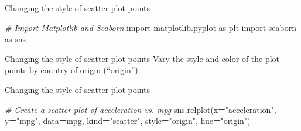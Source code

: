 \documentclass[
  ignorenonframetext,
]{beamer}
\newenvironment{Shaded}{\begin{snugshade}}{\end{snugshade}}
\newcommand{\CommentTok}[1]{\textcolor[rgb]{0.56,0.35,0.01}{\textit{#1}}}
\newcommand{\ImportTok}[1]{#1}
\newcommand{\NormalTok}[1]{#1}
\newcommand{\OperatorTok}[1]{\textcolor[rgb]{0.81,0.36,0.00}{\textbf{#1}}}
\newcommand{\StringTok}[1]{\textcolor[rgb]{0.31,0.60,0.02}{#1}}
\begin{document}
\begin{frame}[fragile]{Changing the style of scatter plot points}
\label{changing-the-style-of-scatter-plot-points-3}

\begin{Shaded}
\begin{Highlighting}[]
\CommentTok{\# Import Matplotlib and Seaborn}
\ImportTok{import}\NormalTok{ matplotlib.pyplot }\ImportTok{as}\NormalTok{ plt}
\ImportTok{import}\NormalTok{ seaborn }\ImportTok{as}\NormalTok{ sns}
\end{Highlighting}
\end{Shaded}
\end{frame}

\begin{frame}{Changing the style of scatter plot points}
\label{changing-the-style-of-scatter-plot-points-4}
Vary the style and color of the plot points by country of origin
(``origin'').
\end{frame}

\begin{frame}[fragile]{Changing the style of scatter plot points}
\label{changing-the-style-of-scatter-plot-points-5}

\begin{Shaded}
\begin{Highlighting}[]
\CommentTok{\# Create a scatter plot of acceleration vs. mpg}
\NormalTok{sns.relplot(x}\OperatorTok{=}\StringTok{"acceleration"}\NormalTok{, y}\OperatorTok{=}\StringTok{"mpg"}\NormalTok{, }
\NormalTok{            data}\OperatorTok{=}\NormalTok{mpg, kind}\OperatorTok{=}\StringTok{"scatter"}\NormalTok{, }
\NormalTok{            style}\OperatorTok{=}\StringTok{"origin"}\NormalTok{, hue}\OperatorTok{=}\StringTok{"origin"}\NormalTok{)}
\end{Highlighting}
\end{Shaded}
\end{frame}
\end{document}
